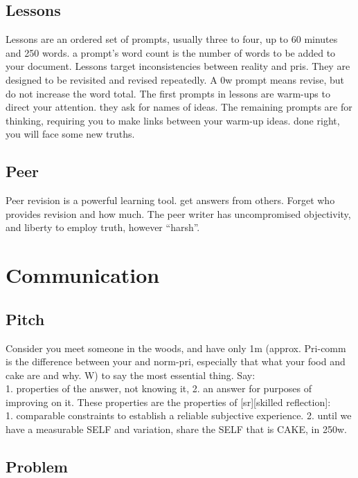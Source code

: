\documentclass[
]{book}
\begin{document}
\hypertarget{lessons}{%
\section{Lessons}\label{lessons}}

Lessons are an ordered set of prompts, usually three to four, up to 60 minutes and 250 words. a prompt's word count is the number of words to be added to your document.
Lessons target inconsistencies between reality and pris.
They are designed to be revisited and revised repeatedly.
A 0w prompt means revise, but do not increase the word total.
The first prompts in lessons are warm-ups to direct your attention. they ask for names of ideas.
The remaining prompts are for thinking, requiring you to make links between your warm-up ideas. done right, you will face some new truths.

\hypertarget{peer}{%
\section{Peer}\label{peer}}

Peer revision is a powerful learning tool. get answers from others.
Forget who provides revision and how much.
The peer writer has uncompromised objectivity, and liberty to employ truth, however ``harsh''.

\hypertarget{communication}{%
\chapter{Communication}\label{communication}}

\hypertarget{comm-pitch}{%
\section{Pitch}\label{comm-pitch}}

Consider you meet someone in the woods, and have only 1m (approx.
Pri-comm is the difference between your and norm-pri, especially that what your food and cake are and why.
W) to say the most essential thing.
Say:\\
1. properties of the answer, not knowing it,
2. an answer for purposes of improving on it.
These properties are the properties of {[}sr{]}{[}skilled reflection{]}:\\
1. comparable constraints to establish a reliable subjective
experience.
2. until we have a measurable SELF and variation, share the SELF
that is CAKE, in 250w.

\hypertarget{comm-problem}{%
\section{Problem}\label{comm-problem}}
\end{document}
